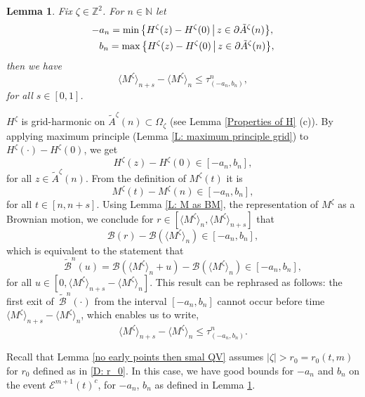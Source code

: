 \documentclass[11pt]{article}
\makeatletter
\renewenvironment{proof}[1][\proofname]{
   \par\pushQED{\qed}\normalfont
   \topsep6\p@\@plus6\p@\relax
   \trivlist\item[\hskip\labelsep\bfseries#1\@addpunct{.}]
   \ignorespaces
}{
   \popQED\endtrivlist\@endpefalse
}
\numberwithin{equation}{section}
\def\OZ{\Omega_{\zeta}}
\def\MZT{M^{\zeta}(t)}
\def\mydot{\boldsymbol{\cdot}}
\newtheorem{lemma}[theorem]{Lemma}
\makeatother
\begin{document}
\begin{lemma}
  \label{small increment of QVM}
  Fix $\zeta \in \mathbb{Z}^2$. 
  For $n \in \mathbb{N}$ let 
  \begin{equation}  \nonumber
    \begin{split}
      - & a_n = \min \big{\{}
        H^{\zeta}(z) - H^{\zeta}(0) \,\big|\, 
        z \in \partial \tilde{A}^{\zeta}(n) \big{\}},\\
      & b_n = \max
      \big{\{} H^{\zeta}(z) - H^{\zeta}(0) \, \big|\, 
      z \in \partial \tilde{A}^{\zeta}(n) \big{\}},
    \end{split}
  \end{equation}
  then we have
  $$
    \langle M^{\zeta} \rangle _{n+s} - 
    \langle M^{\zeta} \rangle _n
    \leq \tau_{(-a_n, b_n)}^n,
  $$
  for all $s \in [0,1]$.
\end{lemma}

\begin{proof}
  $H^{\zeta}$ is grid-harmonic on $\tilde{A}^{\zeta}(n) \subset \OZ$  
  (see Lemma \ref{Properties of H} (c)).
  By applying maximum principle (Lemma \ref{L: maximum principle grid}) to 
  $H^{\zeta}(\mydot) - H^{\zeta}(0)$, we get
  $$
    H^{\zeta}(z) - H^{\zeta}(0) \in [-a_n, b_n],
  $$
  for all $z \in \tilde{A}^{\zeta}(n)$. From the definition of $\MZT$ it is 
  $$
    \MZT - M^{\zeta}(n) \in [-a_n, b_n],
  $$
  for all $t \in [n, n+s]$.
  Using Lemma \ref{L: M as BM}, the representation of $M^{\zeta}$ as a Brownian motion, 
  we conclude for 
  $r \in [ \langle M^{\zeta} \rangle _n, \langle M^{\zeta} \rangle _{n+s}]$ that
  $$
    \mathcal{B}(r) - 
    \mathcal{B}( \langle M^{\zeta} \rangle _n)
    \in [-a_n, b_n],
  $$
  which is equivalent to the statement that
  $$
    \tilde{\mathcal{B}}^n(u) = 
    \mathcal{B}(\langle M^{\zeta} \rangle _n + u) 
      - \mathcal{B}(\langle M^{\zeta} \rangle _n)
      \in [-a_n, b_n],
  $$
  for all
  $u \in [0, \langle M^{\zeta} \rangle _{n+s} 
            -\langle M^{\zeta} \rangle _n ]$.
  This result can be rephrased as follows:
  the first exit of $\,\tilde{\mathcal{B}}^n(\mydot)$
  from the interval $[-a_n, b_n]$ cannot occur before time 
  $\langle M^{\zeta} \rangle _{n+s} -\langle M^{\zeta} \rangle _n$,
  which enables us to write,
  $$
  \langle M^{\zeta} \rangle _{n+s} 
    - \langle M^{\zeta} \rangle _n
  \leq \tau_{(-a_n, b_n)}^n
  .$$
\end{proof}

Recall that Lemma \ref{no early points then smal QV} 
assumes $|\zeta| > r_0 = r_0(t,m)$ for $r_0$ defined as in \eqref{D: r_0}. 
In this case, we have good bounds for $-a_n$ and $b_n$ on the event $\mathcal{E}^{m+1}(t)^c$, 
for $-a_n$, $b_n$ as defined in Lemma \ref{small increment of QVM}.
 
\end{document}
